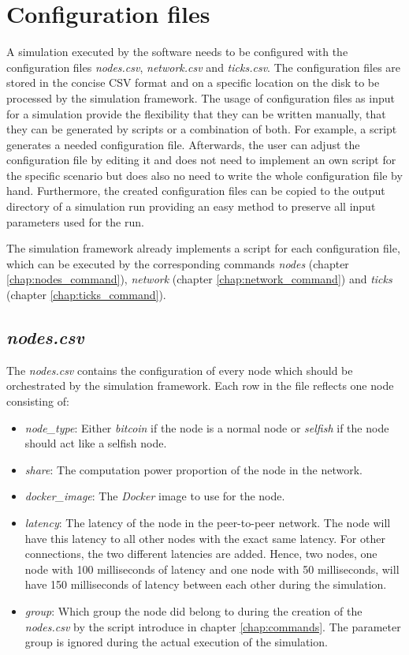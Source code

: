 \section{Configuration files}
\label{chap:config_files}

A simulation executed by the software needs to be configured with the configuration files \textit{nodes.csv}, \textit{network.csv} and \textit{ticks.csv}.
The configuration files are stored in the concise CSV format and on a specific location on the disk to be processed by the simulation framework.
The usage of configuration files as input for a simulation provide the flexibility that they can be written manually, that they can be generated by scripts or a combination of both.
For example, a script generates a needed configuration file.
Afterwards, the user can adjust the configuration file by editing it and does not need to implement an own script for the specific scenario but does also no need to write the whole configuration file by hand.
Furthermore, the created configuration files can be copied to the output directory of a simulation run providing an easy method to preserve all input parameters used for the run.

The simulation framework already implements a script for each configuration file, which can be executed by the corresponding commands \textit{nodes} (chapter \ref{chap:nodes_command}), \textit{network} (chapter \ref{chap:network_command}) and \textit{ticks} (chapter \ref{chap:ticks_command}).

\subsection{\textit{nodes.csv}}

The \textit{nodes.csv} contains the configuration of every node which should be orchestrated by the simulation framework.
Each row in the file reflects one node consisting of:
\begin{itemize}
	\item \textit{node\_type}: Either \textit{bitcoin} if the node is a normal node or \textit{selfish} if the node should act like a selfish node.
	\item \textit{share}: The computation power proportion of the node in the network.
	\item \textit{docker\_image}: The \textit{Docker} image to use for the node.
	\item \textit{latency}: The latency  of the node in the peer-to-peer network.
	The node will have this latency to all other nodes with the exact same latency.
	For other connections, the two different latencies are added.
	Hence, two nodes, one node with 100 milliseconds of latency and one node with 50 milliseconds, will have 150 milliseconds of latency between each other during the simulation.
	\item \textit{group}: Which group the node did belong to during the creation of the \textit{nodes.csv} by the script introduce in chapter \ref{chap:commands}.
	The parameter group is ignored during the actual execution of the simulation.
\end{itemize}
 
